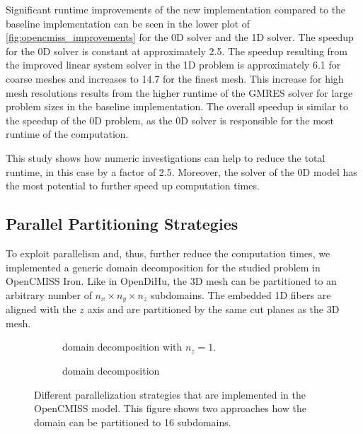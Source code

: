 Significant runtime improvements of the new implementation compared to the baseline implementation can be seen in the lower plot of   \cref{fig:opencmiss_improvements} for the 0D solver and the 1D solver. The speedup for the 0D solver is constant at approximately 2.5. The speedup resulting from the improved linear system solver in the 1D problem is approximately 6.1 for coarse meshes and increases to 14.7 for the finest mesh. This increase for high mesh resolutions results from the higher runtime of the GMRES solver for large problem sizes in the baseline implementation. The overall speedup is similar to the speedup of the 0D problem, as the 0D solver is responsible for the most runtime of the computation.

This study shows how numeric investigations can help to reduce the total runtime, in this case by a factor of 2.5. Moreover, the solver of the 0D model has the most potential to further speed up computation times.

\subsection{Parallel Partitioning Strategies}\label{sec:opencmiss_parallel_partitioning}

To exploit parallelism and, thus, further reduce the computation times, we implemented a generic domain decomposition for the studied problem in OpenCMISS Iron.
Like in OpenDiHu, the 3D mesh can be partitioned to an arbitrary number of $n_x \times n_y \times n_z$ subdomains. The embedded 1D fibers are aligned with the $z$ axis and are partitioned by the same cut planes as the 3D mesh.

\begin{figure}[H]
  \centering%
  \begin{subfigure}[t]{0.48\textwidth}%
    \centering%
    \def\svgwidth{0.7\textwidth}
    \caption{ domain decomposition with $n_z=1$.}%
    \label{fig:opencmiss_ddpillar}%
  \end{subfigure}
  \quad
  \begin{subfigure}[t]{0.48\textwidth}%
    \centering%
    \def\svgwidth{0.7\textwidth}
    \caption{ domain decomposition}%
    \label{fig:opencmiss_ddcube}%
  \end{subfigure}   
  \caption{Different parallelization strategies that are implemented in the OpenCMISS model. This figure shows two approaches how the domain can be partitioned to 16 subdomains.}%
  \label{fig:opencmiss_dd_annotated}%
\end{figure}%

